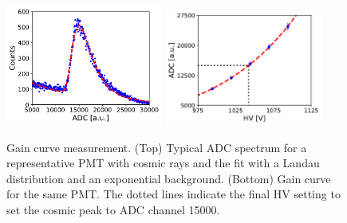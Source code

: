 \documentclass[review,number,sort&compress]{elsarticle}
\begin{document}
\begin{figure}[tb]
	\centering
			\includegraphics[width=0.46\textwidth]{fig15a-adcfit.pdf}
			\includegraphics[width=0.46\textwidth]{fig15b-gaincurve.pdf}
		
		\caption{Gain curve measurement. (Top) Typical ADC spectrum for a representative PMT with cosmic rays
                  and the fit with a Landau distribution and an exponential background. (Bottom) Gain curve for the same
                  PMT. The dotted lines indicate the final HV setting to set the cosmic peak to ADC channel 15000. }
\label{fig:gain-curve}
\end{figure}
\end{document}
